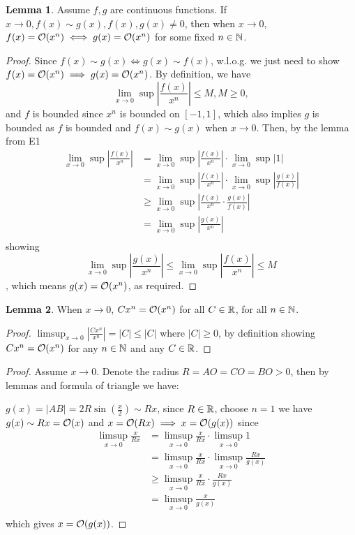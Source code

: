 \documentclass{homework}
\newcommand{\R}{\bb{R}} %
\newcommand{\N}{\bb{N}} %
\newcommand{\?}{\stackrel{?}{=}}
\theoremstyle{definition}
\newtheorem*{lemma}{Lemma}
\begin{document}
\begin{lemma}
    Assume $f,g$ are continuous functions. If $x\to0, f(x)\sim g(x), f(x), g(x)\neq0$, then when $x\to0$, $f(x)=\cal{O}(x^n)\iff g(x)=\cal{O}(x^n)$ for some fixed $n\in\N$.

    \begin{proof}
        Since $f(x)\sim g(x)\iff g(x)\sim f(x)$, w.l.o.g. we just need to show $f(x)=\cal{O}(x^n)\implies g(x)=\cal{O}(x^n)$. By definition, we have \[\lim_{x\to0}\sup|\frac{f(x)}{x^n}|\leq M, M\geq0,\] and $f$ is bounded since $x^n$ is bounded on $[-1,1]$, which also implies $g$ is bounded as $f$ is bounded and $f(x)\sim g(x)$ when $x\to0$. Then, by the lemma from E1  \begin{align*}
            \lim_{x\to0}\sup|\frac{f(x)}{x^n}|&=\lim_{x\to0}\sup|\frac{f(x)}{x^n}|\cdot\lim_{x\to0}\sup|1|\\
            &=\lim_{x\to0}\sup|\frac{f(x)}{x^n}|\cdot\lim_{x\to0}\sup|\frac{g(x)}{f(x)}|\\
            &\geq \lim_{x\to0}\sup|\frac{f(x)}{x^n}\cdot\frac{g(x)}{f(x)}|\\
            &=\lim_{x\to0}\sup|\frac{g(x)}{x^n}|\\
        \end{align*}
        showing \[\lim_{x\to0}\sup|\frac{g(x)}{x^n}|\leq\lim_{x\to0}\sup|\frac{f(x)}{x^n}|\leq M\], which means $g(x)=\cal{O}(x^n)$, as required.
    \end{proof}
\end{lemma}

\begin{lemma}
    When $x\to0$, $Cx^n=\cal{O}(x^n)$ for all $C\in\R$, for all $n\in\N$. 

    \begin{proof}
        $\limsup_{x\to0}|\frac{Cx^n}{x^n}|=|C|\leq |C|$ where $|C|\geq0$, by definition showing $Cx^n=\cal{O}(x^n)$ for any $n\in\N$ and any $C\in\R$.
    \end{proof}
\end{lemma}

\begin{proof}
    Assume $x\to0$. Denote the radius $R=AO=CO=BO>0$, then by lemmas and formula of triangle we have:

    \(g(x)=|AB|=2R\sin(\frac{x}2)\sim Rx\), since $R\in\R$, choose $n=1$ we have \(g(x)\sim Rx=\cal{O}(x)\) and $x=\cal{O}(Rx)\implies x=\cal{O}(g(x))$ since \begin{align*}
        \limsup_{x\to0}\frac{x}{Rx}&=\limsup_{x\to0}\frac{x}{Rx}\cdot\limsup_{x\to0}1\\
        &=\limsup_{x\to0}\frac{x}{Rx}\cdot\limsup_{x\to0}\frac{Rx}{g(x)}\\
        &\geq\limsup_{x\to0}\frac{x}{Rx}\cdot\frac{Rx}{g(x)}\\
        &=\limsup_{x\to0}\frac{x}{g(x)}\\
    \end{align*} which gives $x=\cal{O}(g(x))$.
\end{proof}
\end{document}
